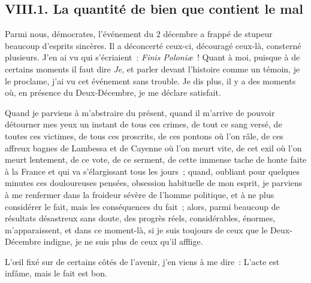 \documentclass[french,twoside]{book} %
\begin{document}
\subsection[{VIII.1. La quantité de bien que contient le mal}]{VIII.1. La quantité de bien que contient le mal}
\noindent Parmi nous, démocrates, l’événement du 2 décembre a frappé de stupeur beaucoup d’esprits sincères. Il a déconcerté ceux-ci, découragé ceux-là, consterné plusieurs. J’en ai vu qui s’écriaient : \emph{Finis Poloniæ} ! Quant à moi, puisque à de certains moments il faut dire \emph{Je}, et parler devant l’histoire comme un témoin, je le proclame, j’ai vu cet événement sans trouble. Je dis plus, il y a des moments où, en présence du Deux-Décembre, je me déclare satisfait.\par
Quand je parviens à m’abstraire du présent, quand il m’arrive de pouvoir détourner mes yeux un instant de tous ces crimes, de tout ce sang versé, de toutes ces victimes, de tous ces proscrits, de ces pontons où l’on râle, de ces affreux bagnes de Lambessa et de Cayenne où l’on meurt vite, de cet exil où l’on meurt lentement, de ce vote, de ce serment, de cette immense tache de honte faite à la France et qui va s’élargissant tous les jours ; quand, oubliant pour quelques minutes ces douloureuses pensées, obsession habituelle de mon esprit, je parviens à me renfermer dans la froideur sévère de l’homme politique, et à ne plus considérer le fait, mais les conséquences du fait ; alors, parmi beaucoup de résultats désastreux sans doute, des progrès réels, considérables, énormes, m’apparaissent, et dans ce moment-là, si je suis toujours de ceux que le Deux-Décembre indigne, je ne suis plus de ceux qu’il afflige.\par
L’œil fixé sur de certains côtés de l’avenir, j’en viens à me dire : L’acte est infâme, mais le fait est bon.\par
\end{document}
